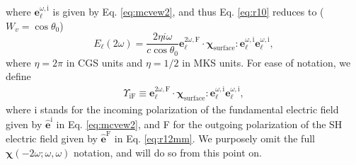 \documentclass[aps,prb,10pt,showpacs,letterpaper,twocolumn]{revtex4-1}
\begin{document}
where $\mathbf{e}^{\omega,\mathrm{i}}_{\ell}$ is given by Eq. \eqref{eq:mcvew2},
and thus Eq. \eqref{eq:r10} reduces to ($W_{v} = \cos\theta_{0}$)
\begin{equation}\label{eq:mr10}
E_{\ell}(2\omega) 
= \frac{2\eta i \omega}{c\cos\theta_{0}}
\mathbf{e}^{2\omega,\mathrm{F}}_{\ell}\cdot
\boldsymbol{\chi}_{\mathrm{surface}}:\mathbf{e}^{\omega,\mathrm{i}}_{\ell}
                  \mathbf{e}^{\omega,\mathrm{i}}_{\ell},
\end{equation}
where $\eta = 2\pi$ in CGS units and $\eta = 1/2$ in MKS units. For ease of
notation, we define
\begin{align}\label{eq:mc0}
\Upsilon_{\mathrm{iF}}
\equiv 
\mathbf{e}^{2\omega,\mathrm{F}}_{\ell}\cdot
\boldsymbol{\chi}_{\mathrm{surface}}:\mathbf{e}^{\omega,\mathrm{i}}_{\ell}
                  \mathbf{e}^{\omega,\mathrm{i}}_{\ell},
\end{align}
where i stands for the incoming polarization of the fundamental electric field
given by $\hat{\mathbf{e}}^{\mathrm{i}}$ in Eq. \eqref{eq:mcvew2}, and F for the
outgoing polarization of the SH electric field given by
$\hat{\mathbf{e}}^{\mathrm{F}}$ in Eq. \eqref{eq:r12mm}. We purposely omit the
full $\boldsymbol{\chi}(-2\omega;\omega,\omega)$ notation, and will do so from
this point on.
\end{document}

